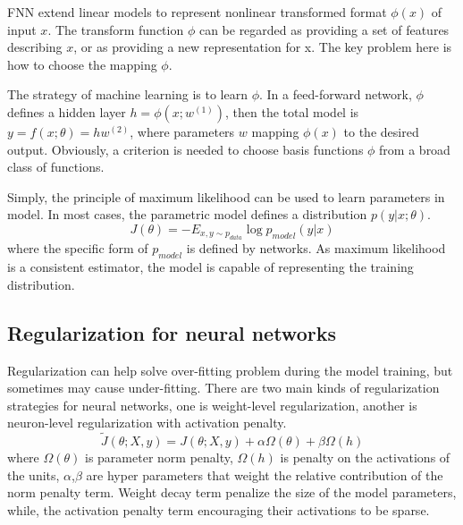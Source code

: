 FNN extend linear models to represent nonlinear transformed format $\phi(x)$ of input $x$. The transform function $\phi$ can be regarded as providing a set of features describing $x$, or as providing a new representation for x. The key problem here is how to choose the mapping $\phi$.

The strategy of machine learning is to learn $\phi$. In a feed-forward network, $\phi$ defines a hidden layer $h=\phi(x;w^{(1)})$, then the total model is $y=f(x;\theta)=hw^{(2)}$, where parameters $w$ mapping $\phi(x)$ to the desired output.
Obviously, a criterion is needed to choose basis functions $\phi$ from a broad class of functions.

Simply, the principle of maximum likelihood can be used to learn parameters in model. In most cases, the parametric model defines a distribution $p(y|x;\theta)$.
\begin{equation}
J(\theta ) =  - {E_{x,y \sim {p_{data}}}}\log {p_{model}}(y|x)
\end{equation}
where the specific form of $p_{model}$ is defined by networks.
As maximum likelihood is a consistent estimator, the model is capable of representing the training distribution.

\subsection{Regularization for neural networks}
Regularization can help solve over-fitting problem during the model training, but sometimes may cause under-fitting.
There are two main kinds of regularization strategies for neural networks, one is weight-level regularization, another is neuron-level regularization with activation penalty.
\begin{equation}
\tilde J(\theta ;X,y) = J(\theta ;X,y) + \alpha \Omega (\theta )+ \beta \Omega (h)
\end{equation}
where $\Omega (\theta )$ is parameter norm penalty, $\Omega (h)$ is penalty on the activations of the units, $\alpha$,$\beta$ are hyper parameters that weight the relative contribution of
the norm penalty term. Weight decay term penalize the size of the model parameters, while, the activation penalty term encouraging their activations to be sparse.

